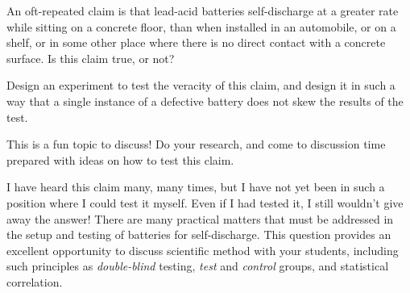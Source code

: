 

An oft-repeated claim is that lead-acid batteries self-discharge at a greater rate while sitting on a concrete floor, than when installed in an automobile, or on a shelf, or in some other place where there is no direct contact with a concrete surface.  Is this claim true, or not?

Design an experiment to test the veracity of this claim, and design it in such a way that a single instance of a defective battery does not skew the results of the test.







This is a fun topic to discuss!  Do your research, and come to discussion time prepared with ideas on how to test this claim.







I have heard this claim many, many times, but I have not yet been in such a position where I could test it myself.  Even if I had tested it, I still wouldn't give away the answer!  There are many practical matters that must be addressed in the setup and testing of batteries for self-discharge.  This question provides an excellent opportunity to discuss scientific method with your students, including such principles as {\it double-blind} testing, {\it test} and {\it control} groups, and statistical correlation.




